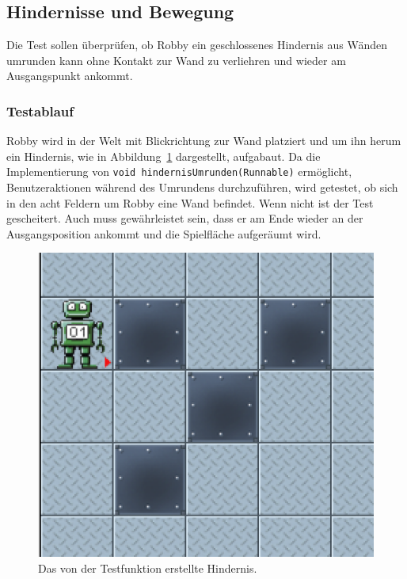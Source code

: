 \subsection{Hindernisse und Bewegung}
Die Test sollen überprüfen, ob Robby ein geschlossenes Hindernis aus Wänden umrunden kann ohne Kontakt zur Wand zu verliehren und wieder am Ausgangspunkt ankommt.

\subsubsection*{Testablauf}
Robby wird in der Welt mit Blickrichtung zur Wand platziert und um ihn herum ein Hindernis, wie in Abbildung~\ref{img:obstacle} dargestellt, aufgabaut. Da die Implementierung von \texttt{void hindernisUmrunden(Runnable)} ermöglicht, Benutzeraktionen während des Umrundens durchzuführen, wird getestet, ob sich in den acht Feldern um Robby eine Wand befindet. Wenn nicht ist der Test gescheitert. Auch muss gewährleistet sein, dass er am Ende wieder an der Ausgangsposition ankommt und die Spielfläche aufgeräumt wird.

\begin{figure}
\centering
\includegraphics[width=0.8\linewidth]{img/obstacle}
\caption{Das von der Testfunktion erstellte Hindernis. }
\label{img:obstacle}
\end{figure}
